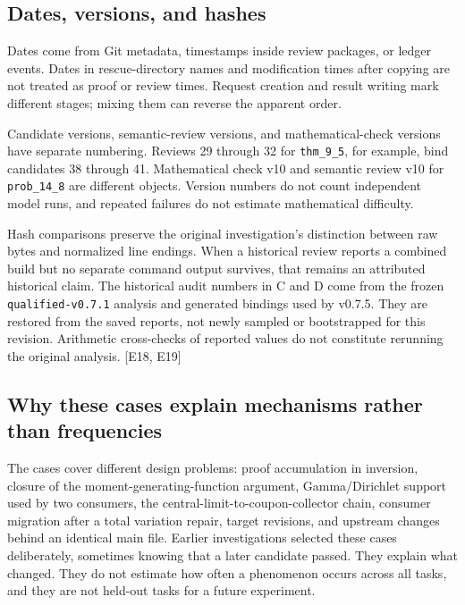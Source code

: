 \subsection[Dates, versions, and hashes]{\texorpdfstring{\protect\hypertarget{a2}{}Dates, versions, and hashes}{Dates, versions, and hashes}}
Dates come from Git metadata, timestamps inside review packages, or ledger events. Dates in rescue-directory names and modification times after copying are not treated as proof or review times. Request creation and result writing mark different stages; mixing them can reverse the apparent order.

Candidate versions, semantic-review versions, and mathematical-check versions have separate numbering. Reviews 29 through 32 for \nolinkurl{thm_9_5}, for example, bind candidates 38 through 41. Mathematical check v10 and semantic review v10 for \nolinkurl{prob_14_8} are different objects. Version numbers do not count independent model runs, and repeated failures do not estimate mathematical difficulty.

Hash comparisons preserve the original investigation's distinction between raw bytes and normalized line endings. When a historical review reports a combined build but no separate command output survives, that remains an attributed historical claim. The historical audit numbers in C and D come from the frozen \nolinkurl{qualified-v0.7.1} analysis and generated bindings used by v0.7.5. They are restored from the saved reports, not newly sampled or bootstrapped for this revision. Arithmetic cross-checks of reported values do not constitute rerunning the original analysis. [E18, E19]

\subsection[Why these cases explain mechanisms rather than frequencies]{\texorpdfstring{\protect\hypertarget{a3}{}Why these cases explain mechanisms rather than frequencies}{Why these cases explain mechanisms rather than frequencies}}
The cases cover different design problems: proof accumulation in inversion, closure of the moment-generating-function argument, Gamma/Dirichlet support used by two consumers, the central-limit-to-coupon-collector chain, consumer migration after a total variation repair, target revisions, and upstream changes behind an identical main file. Earlier investigations selected these cases deliberately, sometimes knowing that a later candidate passed. They explain what changed. They do not estimate how often a phenomenon occurs across all tasks, and they are not held-out tasks for a future experiment.


